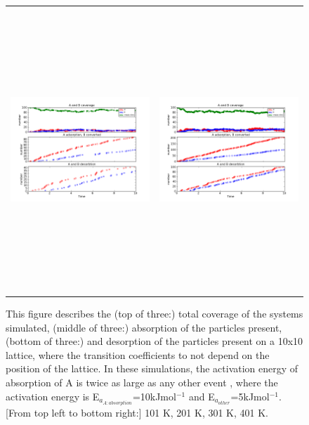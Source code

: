 \documentclass[11pt]{article}
\begin{document}
\begin{figure}[h!]
\begin{tabular}{cc}
\includegraphics[width=3.5in, height=4.2in]{./coadsorb_irreversible/AtoBirreversible10x10_301_Aabs2x_EA10E3_EB5E3_3.png} &
\includegraphics[width=3.5in, height=4.2in]{./coadsorb_irreversible/AtoBirreversible10x10_401_Aabs2x_EA10E3_EB5E3_3.png} 
\end{tabular}
\caption{This figure describes the (top of three:) total coverage of the systems simulated, (middle of three:) absorption of the particles present, (bottom of three:) and desorption of the particles present on a 10x10 lattice, where the transition coefficients to not depend on the position of the lattice. In these simulations, the activation energy of absorption of A is twice as large as any other event , where the activation energy is E$_{a_{A:absorption}}$=10kJmol$^{-1}$ and E$_{a_{other}}$=5kJmol$^{-1}$. [From top left to bottom right:] 101 K, 201 K, 301 K, 401 K. }
\end{figure}
\end{document}
